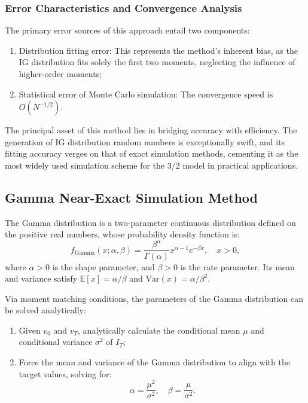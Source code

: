 \subsubsection{Error Characteristics and Convergence Analysis}
The primary error sources of this approach entail two components:
\begin{enumerate}
    \item Distribution fitting error: This represents the method's inherent bias, as the IG distribution fits solely the first two moments, neglecting the influence of higher-order moments;
    \item Statistical error of Monte Carlo simulation: The convergence speed is $O(N^{-1/2})$.
\end{enumerate}

The principal asset of this method lies in bridging accuracy with efficiency. The generation of IG distribution random numbers is exceptionally swift, and its fitting accuracy verges on that of exact simulation methods, cementing it as the most widely used simulation scheme for the $3/2$ model in practical applications.

\subsection{Gamma Near-Exact Simulation Method}
The Gamma distribution is a two-parameter continuous distribution defined on the positive real numbers, whose probability density function is:
\begin{equation}
  f_{\text{Gamma}}(x; \alpha, \beta) = \frac{\beta^\alpha}{\Gamma(\alpha)} x^{\alpha-1} e^{-\beta x}, \quad x > 0,
\end{equation}
where $\alpha > 0$ is the shape parameter, and $\beta > 0$ is the rate parameter. Its mean and variance satisfy $\mathbb{E}[x] = \alpha/\beta$ and $\mathrm{Var}(x) = \alpha/\beta^2$.

Via moment matching conditions, the parameters of the Gamma distribution can be solved analytically:
\begin{enumerate}
    \item Given $v_0$ and $v_T$, analytically calculate the conditional mean $\mu$ and conditional variance $\sigma^2$ of $I_T$;
    
    \item Force the mean and variance of the Gamma distribution to align with the target values, solving for:
    \begin{equation}
    \alpha = \frac{\mu^2}{\sigma^2}, \quad \beta = \frac{\mu}{\sigma^2}.
    \end{equation}
\end{enumerate}

